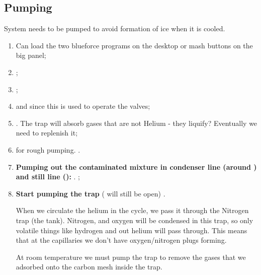 \subsection{Pumping}
System needs to be pumped to avoid formation of ice when it is cooled.
\begin{enumerate}
  \item Can load the two blueforce programs on the desktop or mash buttons on
        the big panel;
  \item {};
  \item {};
  \item {} and
         since this is used to operate the valves;
  \item {}. The trap will absorb
        gases that are not Helium - they liquify? Eventually we need to
        replenish it;
  \item {} for rough pumping.
        .
  \item \textbf{Pumping out the contaminated mixture in condenser line (around
        ) and still line ():} . ;
  \item \textbf{Start pumping the trap}  ( will still be open) \ira {}.

        When we circulate the helium in the cycle, we pass it through the
        Nitrogen trap (the tank). Nitrogen, and oxygen will be condensed in this
        trap, so only volatile things like hydrogen and out helium will pass
        through. This means that at the capillaries we don't have
        oxygen/nitrogen plugs forming.

        At room temperature we must pump the trap to remove the gases that we
        adsorbed onto the carbon mesh inside the trap.


\end{enumerate}
